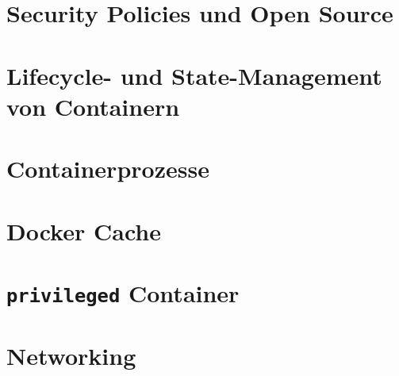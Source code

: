 \documentclass[../main.tex]{subfiles}
\begin{document}

  \section{Security Policies und Open Source}






  \section{Lifecycle- und State-Management von Containern}

  \section{Containerprozesse}
	\section{Docker Cache}
	\section{\texttt{privileged} Container}

	\section{Networking}
\end{document}
